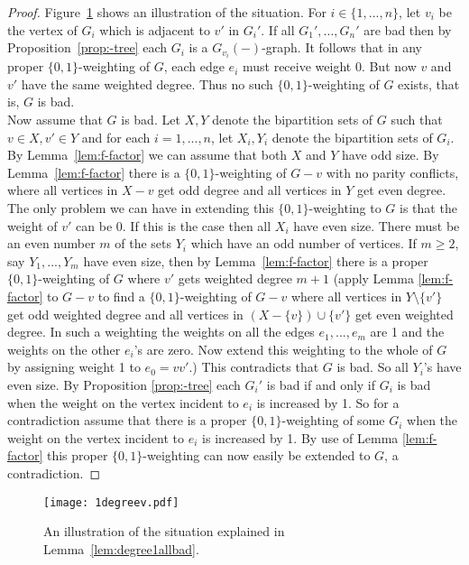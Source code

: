 \documentclass[
final,
 nomarks,
]{dmtcs-episciences}
\theoremstyle{definition}
\begin{document}
\begin{proof}
Figure~\ref{fig:1degreev} shows an illustration of the situation. For $i \in \{1,...,n\}$, let $v_i$ be the vertex of $G_i$ which is adjacent to $v'$ in $G_i'$. If all $G_1',...,G_n'$ are bad then by Proposition~\ref{prop:-tree} each $G_i$ is a $G_{v_i}(-)$-graph. It follows that in any proper $\{0,1\}$-weighting of $G$, each edge $e_i$ must receive weight 0. But now $v$ and $v'$ have the same weighted degree. Thus no such $\{0,1\}$-weighting of $G$ exists, that is, $G$ is bad. \\
Now assume that $G$ is bad. Let $X, Y$ denote the bipartition sets of $G$ such that $v \in X, v' \in Y$ and for each $i=1,...,n$,  let $X_i, Y_i$ denote the bipartition sets of $G_i$. By Lemma~\ref{lem:f-factor} we can assume that both $X$ and $Y$ have odd size.  By Lemma~\ref{lem:f-factor} there is a  $\{0,1\}$-weighting of $G-v$ with no parity conflicts, where all vertices in $X-v$ get odd degree and all vertices in $Y$ get even degree. The only problem we can have in extending this $\{0,1\}$-weighting to $G$ is that the weight of $v'$ can be 0. If this is the case then all $X_i$ have even size. There must be an even number $m$ of the sets $Y_i$ which have an odd number of vertices. If $m \geq 2$, say $Y_1,...,Y_m$ have even size, then by Lemma~\ref{lem:f-factor} there is a proper $\{0,1\}$-weighting of $G$ where $v'$ gets weighted degree $m+1$ (apply Lemma \ref{lem:f-factor} to $G-v$ to find a $\{0,1\}$-weighting of $G-v$ where all vertices in $Y \setminus \{v'\}$ get odd weighted degree and all vertices in $(X-\{v\}) \cup \{v'\}$ get even weighted degree. In such a weighting the weights on all the edges $e_1,...,e_m$ are 1 and the weights on the other $e_i$'s are zero. Now extend this weighting to the whole of $G$ by assigning weight 1 to $e_0=vv'$.) This contradicts that $G$ is bad. So all $Y_i$'s have even size. 
By Proposition \ref{prop:-tree} each $G_i'$ is bad if and only if $G_i$ is bad when the weight on the vertex incident to $e_i$ is increased by 1. So for a contradiction assume that there is a proper $\{0,1\}$-weighting of some $G_i$ when the weight on the vertex incident to $e_i$ is increased by 1. By use of Lemma \ref{lem:f-factor} this proper $\{0,1\}$-weighting can now easily be extended to $G$, a contradiction.
\end{proof}
\begin{figure} [H]
\centering
\texttt{[image: 1degreev.pdf]}
\caption{An illustration of the situation explained in Lemma~\ref{lem:degree1allbad}.}
\label{fig:1degreev}
\end{figure}
\end{document}
